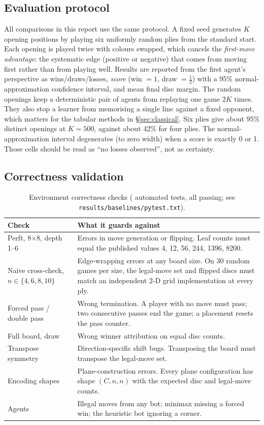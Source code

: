 \documentclass[11pt]{article}
\newcommand{\bx}[1]{#1$\times$#1}
\begin{document}
\subsection{Evaluation protocol}
\label{sec:protocol}
All comparisons in this report use the same protocol. A fixed seed generates
$K$ opening positions by playing six uniformly random plies from the standard
start. Each opening is played twice with colours swapped, which cancels the
\emph{first-move advantage}: the systematic edge (positive or negative) that
comes from moving first rather than from playing well. Results are reported
from the first agent's perspective as wins/draws/losses, \emph{score}
(win $=1$, draw $=\tfrac12$) with a 95\% normal-approximation confidence
interval, and mean final disc margin. The random openings keep a deterministic
pair of agents from replaying one game $2K$ times. They also stop a learner from
memorising a single line against a fixed opponent, which matters for the
tabular methods in \S\ref{sec:classical}. Six plies give about 95\% distinct
openings at $K{=}500$, against about 42\% for four plies. The normal-approximation
interval degenerates (to zero width) when a score is exactly 0 or 1. Those
cells should be read as ``no losses observed'', not as certainty.

\subsection{Correctness validation}

\begin{table}[H]
\centering
\caption{Environment correctness checks (\NumTests{} automated tests, all passing; see
\texttt{results/baselines/pytest.txt}).}
\label{tab:tests}
\begin{tabularx}{\linewidth}{@{}lX@{}}
\toprule
Check & What it guards against \\
\midrule
Perft, \bx{8}, depth 1--6 & Errors in move generation or flipping. Leaf counts must equal the published values 4, 12, 56, 244, 1396, 8200. \\
Naive cross-check, $n\in\{4,6,8,10\}$ & Edge-wrapping errors at any board size. On 30 random games per size, the legal-move set and flipped discs must match an independent 2-D grid implementation at every ply. \\
Forced pass / double pass & Wrong termination. A player with no move must pass; two consecutive passes end the game; a placement resets the pass counter. \\
Full board, draw & Wrong winner attribution on equal disc counts. \\
Transpose symmetry & Direction-specific shift bugs. Transposing the board must transpose the legal-move set. \\
Encoding shapes & Plane-construction errors. Every plane configuration has shape $(C,n,n)$ with the expected disc and legal-move counts. \\
Agents & Illegal moves from any bot; minimax missing a forced win; the heuristic bot ignoring a corner. \\
\bottomrule
\end{tabularx}
\end{table}
\end{document}

